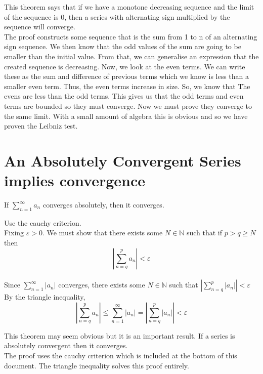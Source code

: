 \documentclass[12pt]{article}
\begin{document}
\begin{explanation}{}
    This theorem says that if we have a monotone decreasing sequence and the limit of the sequence is 0, then a series with alternating sign multiplied by the sequence will converge.\\
The proof constructs some sequence that is the sum from 1 to n of an alternating sign sequence. We then know that the odd values of the sum are going to be smaller than the initial value. From that, we can generalise an expression that the created sequence is decreasing. Now, we look at the even terms. We can write these as the sum and difference of previous terms which we know is less than a smaller even term. Thus, the even terms increase in size. So, we know that The evens are less than the odd terms. This gives us that the odd terms and even terms are bounded so they must converge. Now we must prove they converge to the same limit. With a small amount of algebra this is obvious and so we have proven the Leibniz test.\\
\end{explanation}


\section{An Absolutely Convergent Series implies convergence}
\begin{theo}{}
If \(\displaystyle\sum_{n=1}^\infty a_n\) converges absolutely, then it converges.   
\end{theo}
\begin{prf}{}
Use the cauchy criterion.\\
Fixing \(\varepsilon > 0\). We must show that there exists some \(N \in \mathbb N\) such that if \(p > q \ge N\) then \[\left|\displaystyle\sum_{n = q}^p a_n\right| < \varepsilon\]\\
Since \(\displaystyle\sum_{n=1}^\infty |a_n|\) converges, there exists some \(N \in \mathbb N\) such that \(\left|\displaystyle\sum_{n = q}^p |a_n|\right| < \varepsilon\)\\
By the triangle inequality, \[\left|\displaystyle\sum_{n = q}^p a_n\right| \le \displaystyle\sum_{n=1}^\infty |a_n| = \left|\displaystyle\sum_{n = q}^p |a_n|\right| < \varepsilon \]
\end{prf}
\begin{explanation}{}
    This theorem may seem obvious but it is an important result. If a series is absolutely convergent then it converges.\\
The proof uses the cauchy criterion which is included at the bottom of this document. The triangle inequality solves this proof entirely.\\
\end{explanation}
\end{document}
